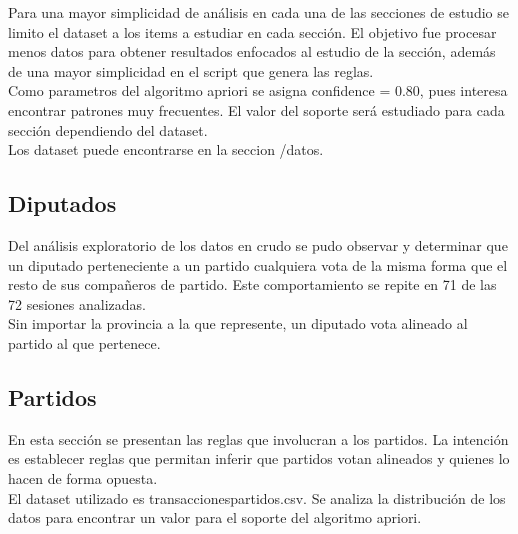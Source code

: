\documentclass{endm}
\begin{document}
Para una mayor simplicidad de análisis en cada una de las secciones de estudio se limito el dataset a los items a estudiar en cada sección. El objetivo fue procesar menos datos para obtener resultados enfocados al estudio de la sección, además de una mayor simplicidad en el script que genera las reglas.\\

Como parametros del algoritmo apriori se asigna confidence = 0.80, pues interesa encontrar patrones muy frecuentes. El valor del soporte será estudiado para cada sección dependiendo del dataset. \\

Los dataset puede encontrarse en la seccion /datos. \\

\subsection{Diputados}

Del análisis exploratorio de los datos en crudo se pudo observar y determinar que un diputado perteneciente a un partido cualquiera vota de la misma forma que el resto de sus compañeros de partido. Este comportamiento se repite en 71 de las 72 sesiones analizadas.\\

Sin importar la provincia a la que represente, un diputado vota alineado al partido al que pertenece.\\


\subsection{Partidos}

En esta sección se presentan las reglas que involucran a los partidos. La intención es establecer reglas que permitan inferir que partidos votan alineados y quienes lo hacen de forma opuesta. \\

El dataset utilizado es transaccionespartidos.csv. Se analiza la distribución de los datos para encontrar un valor para el soporte del algoritmo apriori. \\
\end{document}
